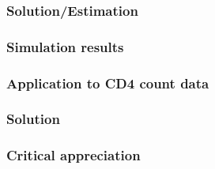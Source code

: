 \documentclass[10pt,dvipsnames,table]{beamer}
\begin{document}
\begin{frame}
\frametitle{Solution/Estimation}

\end{frame}

\begin{frame}
\frametitle{Simulation results}

\end{frame}

\begin{frame}
\frametitle{Application to CD4 count data}

\end{frame}

\begin{frame}
\frametitle{Solution}

\end{frame}

\begin{frame}
\frametitle{Critical appreciation}

\end{frame}
\end{document}
